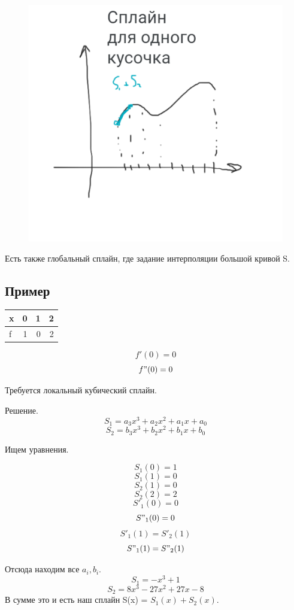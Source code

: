 \documentclass[a4paper,12pt]{article}
\begin{document}
    \begin{figure}[h!]
        \centering
        \includegraphics[width=12cm]{8semPic1.png}
    \end{figure}

Есть также глобальный сплайн, где задание интерполяции большой кривой S.

\subsection{Пример}

\begin{table}[h!]
\centering
\begin{tabular}{|l|r|r|r|}
\hline
x & 0 & 1 & 2 \\ \hline
f & 1 & 0 & 2 \\ \hline
\end{tabular}
\end{table}

$$f'(0) = 0$$
$$f"(0) = 0$$

Требуется локальный кубический сплайн. 

Решение.\\
\[S_1 = a_3x^3 + a_2x^2 + a_1x + a_0\]
\[S_2 = b_3x^3 + b_2x^2 + b_1x + b_0\]

Ищем уравнения.\newpage

\[S_1(0) = 1\]
\[S_1(1) = 0\]
\[S_2(1) = 0\]
\[S_2(2) = 2\]
\[S'_1(0) = 0\]
\[S"_1(0) = 0\]
\[S'_1(1) = S'_2(1)\]
\[S"_1(1) = S"_2(1)\]

Отсюда находим все $a_i, b_i$.
\[S_1 = -x^3 + 1\]
\[S_2 = 8x^3 - 27x^2 + 27x - 8\]
В сумме это и есть наш сплайн S(x) = $S_1(x) + S_2(x)$. 
\end{document}

